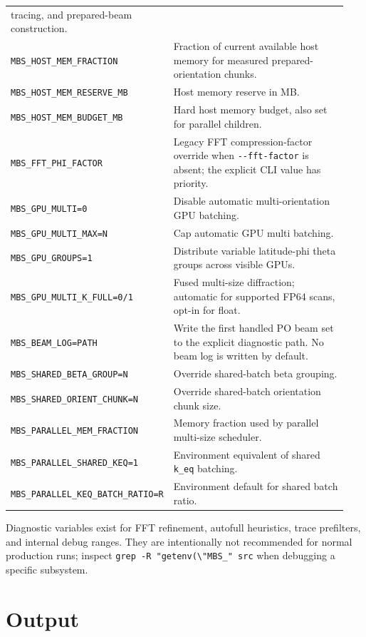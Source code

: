 \documentclass[
  10pt,
  a4paper,
]{article}
\begin{document}
\begin{longtable}[]{@{}L{0.30\linewidth}L{0.64\linewidth}@{}}
tracing, and prepared-beam construction. \\
\texttt{MBS\_HOST\_MEM\_FRACTION} & Fraction of current available host
memory for measured prepared-orientation chunks. \\
\texttt{MBS\_HOST\_MEM\_RESERVE\_MB} & Host memory reserve in MB. \\
\texttt{MBS\_HOST\_MEM\_BUDGET\_MB} & Hard host memory budget, also set
for parallel children. \\
\texttt{MBS\_FFT\_PHI\_FACTOR} & Legacy FFT compression-factor override
when \texttt{-\/-fft-factor} is absent; the explicit CLI value has priority. \\
\texttt{MBS\_GPU\_MULTI=0} & Disable automatic multi-orientation GPU
batching. \\
\texttt{MBS\_GPU\_MULTI\_MAX=N} & Cap automatic GPU multi batching. \\
\texttt{MBS\_GPU\_GROUPS=1} & Distribute variable latitude-phi theta
groups across visible GPUs. \\
\nolinkurl{MBS_GPU_MULTI_K_FULL=0/1} & Fused multi-size diffraction; automatic for supported FP64 scans, opt-in for float. \\
\texttt{MBS\_BEAM\_LOG=PATH} & Write the first handled PO beam set to the
explicit diagnostic path. No beam log is written by default. \\
\texttt{MBS\_SHARED\_BETA\_GROUP=N} & Override shared-batch beta
grouping. \\
\texttt{MBS\_SHARED\_ORIENT\_CHUNK=N} & Override shared-batch
orientation chunk size. \\
\texttt{MBS\_PARALLEL\_MEM\_FRACTION} & Memory fraction used by parallel
multi-size scheduler. \\
\texttt{MBS\_PARALLEL\_SHARED\_KEQ=1} & Environment equivalent of shared
\texttt{k\_eq} batching. \\
\nolinkurl{MBS_PARALLEL_KEQ_BATCH_RATIO=R} & Environment default for
shared batch ratio. \\
\end{longtable}

Diagnostic variables exist for FFT refinement, autofull heuristics,
trace prefilters, and internal debug ranges. They are intentionally not
recommended for normal production runs; inspect
\texttt{grep\ -R\ "getenv(\textbackslash{}"MBS\_"\ src} when debugging a
specific subsystem.

\section{Output}\label{output}
\end{document}
